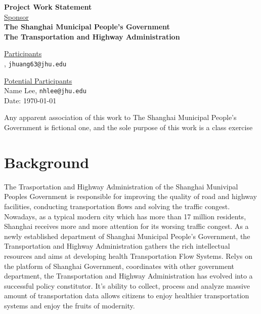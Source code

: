 \documentclass[12pt,letterpaper]{article}
\theoremstyle{definition}
\begin{document}
\def\shiftdowna{0.32in}  %
\def\shiftdownb{0.22in}  %


\begin{center}
\textbf{{\large Project Work Statement}}\\


\vspace \shiftdowna
\underline {Sponsor}\\ 
\vspace{5pt}
\textbf{{\large The Shanghai Municipal People’s Government}}\\


\vspace \shiftdowna
\textbf{{\large The Transportation and Highway Administration}}


\vspace{0.35in}
\vspace \shiftdownb
\underline {Participants} \\
\vspace{5pt}
, \texttt{jhuang63@jhu.edu}

\vspace \shiftdownb
\underline {Potential Participants}\\
\vspace{5pt}
Name Lee, \texttt{nhlee@jhu.edu} \\


\vspace \shiftdowna
Date: \today

\end{center}

\vfill  
\footnoterule
\noindent \small{Any apparent association of this work to The Shanghai Municipal People’s Government is fictional one, and the sole purpose of this work is a class exercise}

\newpage

\section{Background} 
The Trasportation and Highway Administration of the Shanghai Munivipal Peoples Government is responsible for improving the quality of road and highway facilities, conducting transportation flows and solving the traffic congest. Nowadays, as a typical  modern city which has more than 17 million residents, Shanghai receives more and more attention for its worsing traffic congest. As a newly established department of Shanghai Municipal People's Government, the Transportation and Highway Administration gathers the rich intellectual resources and aims at developing health Transportation Flow Systems. Relys on the platform of Shanghai Government, coordinates with other government department, the Transportation and Highway Administration has evolved into a successful policy constitutor. It's ability to collect, process and analyze massive amount of transportation data allows citizens to enjoy healthier transportation systems and enjoy the fruits of modernity.
\end{document}
